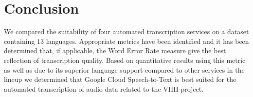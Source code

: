 \documentclass[11pt]{article}
\begin{document}
\section{Conclusion}

We compared the suitability of four automated transcription services on a dataset containing $13$ languages.
Appropriate metrics have been identified and it has been determined that, if applicable, the Word Error Rate measure give the best reflection of transcription quality.
Based on quantitative results using this metric as well as due to its superior language support compared to other services in the lineup we determined that Google Cloud Speech-to-Text is best suited for the automated transcription of audio data related to the VHH project.

\clearpage
\printbibliography
\end{document}
